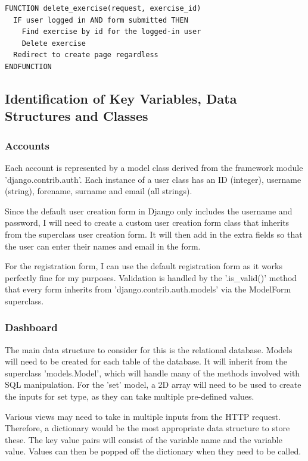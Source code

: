 \documentclass{article}
\begin{document}
\begin{lstlisting}[style=OCRPseudocode, caption={Exercise deletion view}]
  FUNCTION delete_exercise(request, exercise_id)
  IF user logged in AND form submitted THEN
    Find exercise by id for the logged-in user
    Delete exercise
  Redirect to create page regardless
ENDFUNCTION
\end{lstlisting}

\subsection{Identification of Key Variables, Data Structures and Classes}

\subsubsection{Accounts}

Each account is represented by a model class derived from the framework module 'django.contrib.auth'. Each instance of a user class has an ID (integer), username (string), forename, surname and email (all strings). 

Since the default user creation form in Django only includes the username and password, I will need to create a custom user creation form class that inherits from the superclass user creation form. It will then add in the extra fields so that the user can enter their names and email in the form. 

For the registration form, I can use the default registration form as it works perfectly fine for my purposes. Validation is handled by the '.is\_valid()' method that every form inherits from 'django.contrib.auth.models' via the ModelForm superclass. 

\subsubsection{Dashboard}

The main data structure to consider for this is the relational database. Models will need to be created for each table of the database. It will inherit from the superclass 'models.Model', which will handle many of the methods involved with SQL manipulation. For the 'set' model, a 2D array will need to be used to create the inputs for set type, as they can take multiple pre-defined values. 

Various views may need to take in multiple inputs from the HTTP request. Therefore, a dictionary would be the most appropriate data structure to store these. The key value pairs will consist of the variable name and the variable value. Values can then be popped off the dictionary when they need to be called. 
\end{document}
